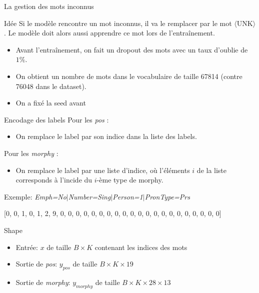 \documentclass[11pt]{beamer}
\begin{document}
\begin{frame}{La gestion des mots inconnus}
    \begin{exampleblock}{Idée}
        Si le modèle rencontre un mot inconnus, il va le remplacer par le mot $\langle$UNK$\rangle$.
        Le modèle doit alors aussi apprendre ce mot lors de l'entraînement.
    \end{exampleblock}

    \begin{itemize}
        \item Avant l'entraînement, on fait un dropout des mots avec un taux d'oublie de $1\%$.
        \item On obtient un nombre de mots dans le vocabulaire de taille 67814 (contre 76048 dans le dataset).
        \item On a fixé la seed avant
    \end{itemize}
\end{frame}

\begin{frame}{Encodage des labels}
    Pour les \textit{pos} :
    \begin{itemize}
        \item On remplace le label par son indice dans la liste des labels.
    \end{itemize}
    Pour les \textit{morphy} :
    \begin{itemize}
        \item On remplace le label par une liste d'indice, où l'éléments $i$ de la liste corresponds à l'incide du $i$-ème type de morphy.
    \end{itemize}
    Exemple: \textit{Emph=No$\mid$Number=Sing$\mid$Person=1$\mid$PronType=Prs}

    [0, 0, 1, 0, 1, 2, 9, 0, 0, 0, 0, 0, 0, 0, 0, 0, 0, 0, 0, 0, 0, 0, 0, 0, 0, 0, 0, 0]

    \begin{exampleblock}{Shape}
        \begin{itemize}
            \item Entrée: $x$ de taille $B \times K$ contenant les indices des mots
            \item Sortie de \textit{pos}: $y_{pos}$ de taille $B \times K \times 19$
            \item Sortie de \textit{morphy}: $y_{morphy}$ de taille $B \times K \times 28 \times 13$
        \end{itemize}
    \end{exampleblock}
\end{frame}
\end{document}
